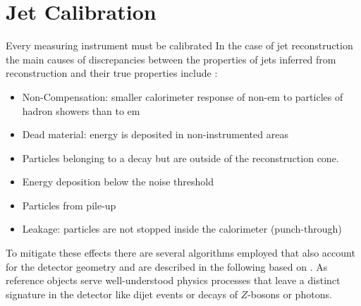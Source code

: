 
\section{Jet Calibration}\label{sec:calibration}
Every measuring instrument must be calibrated In the case of jet reconstruction the main causes of discrepancies between the properties of jets inferred from reconstruction and their true properties include \citep{atlas2011jet}:
\begin{itemize}
  \item Non-Compensation: smaller calorimeter response of non-\ac{em} to particles of hadron showers than to \ac{em}
  \item Dead material: energy is deposited in non-instrumented areas
  \item Particles belonging to a decay but are outside of the reconstruction cone.
  \item Energy deposition below the noise threshold
  \item Particles from pile-up
  \item Leakage: particles are not stopped inside the calorimeter (punch-through)
\end{itemize}
To mitigate these effects there are several algorithms employed that also account for the detector geometry and are described in the following based on \citep{atlas2021jet}. As reference objects serve well-understood physics processes that leave a distinct signature in the detector like dijet events or decays of $Z$-bosons or photons.

